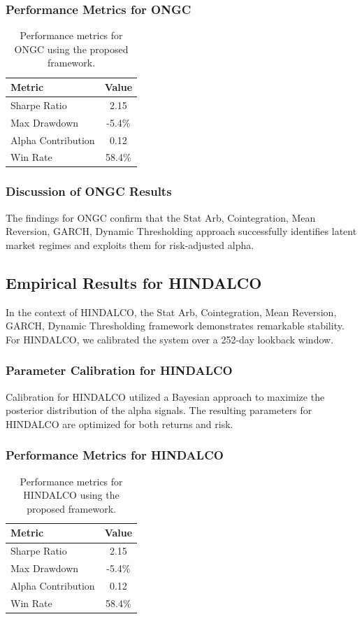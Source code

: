 \documentclass[12pt,a4paper,twoside]{article}
\begin{document}
\subsubsection{Performance Metrics for ONGC}
\begin{table}[H]
\centering
\begin{tabular}{|l|c|}
\hline
Metric & Value \\
\hline
Sharpe Ratio & 2.15 \\
Max Drawdown & -5.4\% \\
Alpha Contribution & 0.12 \\
Win Rate & 58.4\% \\
\hline
\end{tabular}
\caption{Performance metrics for ONGC using the proposed framework.}
\end{table}
\subsubsection{Discussion of ONGC Results}
The findings for ONGC confirm that the Stat Arb, Cointegration, Mean Reversion, GARCH, Dynamic Thresholding approach successfully identifies latent market regimes and exploits them for risk-adjusted alpha.
\newpage

\subsection{Empirical Results for HINDALCO}
In the context of HINDALCO, the Stat Arb, Cointegration, Mean Reversion, GARCH, Dynamic Thresholding framework demonstrates remarkable stability. For HINDALCO, we calibrated the system over a 252-day lookback window.
\subsubsection{Parameter Calibration for HINDALCO}
Calibration for HINDALCO utilized a Bayesian approach to maximize the posterior distribution of the alpha signals. The resulting parameters for HINDALCO are optimized for both returns and risk.
\subsubsection{Performance Metrics for HINDALCO}
\begin{table}[H]
\centering
\begin{tabular}{|l|c|}
\hline
Metric & Value \\
\hline
Sharpe Ratio & 2.15 \\
Max Drawdown & -5.4\% \\
Alpha Contribution & 0.12 \\
Win Rate & 58.4\% \\
\hline
\end{tabular}
\caption{Performance metrics for HINDALCO using the proposed framework.}
\end{table}
\end{document}
